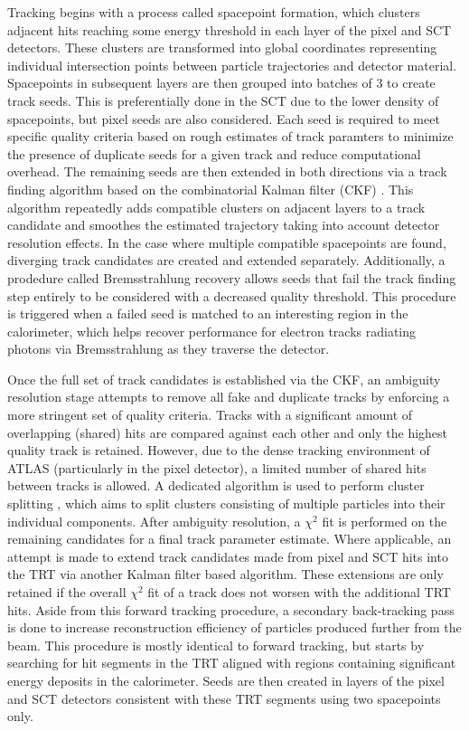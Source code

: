 Tracking begins with a process called spacepoint formation, which clusters adjacent hits reaching some energy 
threshold in each layer of the pixel and SCT detectors. These clusters are transformed into global coordinates 
representing individual intersection points between particle trajectories and detector material. Spacepoints in 
subsequent layers are then grouped into batches of 3 to create track seeds. This is preferentially done in the SCT 
due to the lower density of spacepoints, but pixel seeds are also considered. Each seed is required to meet specific 
quality criteria based on rough estimates of track paramters to minimize the presence of duplicate seeds for a given 
track and reduce computational overhead. The remaining seeds are then extended in both directions via a track 
finding algorithm based on the combinatorial Kalman filter (CKF) \cite{fruehwirt-kalman-filter}. This algorithm 
repeatedly adds compatible clusters on adjacent layers to a track candidate and smoothes the estimated trajectory 
taking into account detector resolution effects. In the case where multiple compatible spacepoints are found, 
diverging track candidates are created and extended separately. Additionally, a prodedure called Bremsstrahlung 
recovery allows seeds that fail the track finding step entirely to be considered with a decreased quality threshold. 
This procedure is triggered when a failed seed is matched to an interesting region in the calorimeter, which helps 
recover performance for electron tracks radiating photons via Bremsstrahlung as they traverse the detector. \par

Once the full set of track candidates is established via the CKF, an ambiguity resolution stage attempts to remove 
all fake and duplicate tracks by enforcing a more stringent set of quality criteria. Tracks with a significant 
amount of overlapping (shared) hits are compared against each other and only the highest quality track is retained. 
However, due to the dense tracking environment of ATLAS (particularly in the pixel detector), a limited number of 
shared hits between tracks is allowed. A dedicated algorithm is used to perform cluster splitting 
\cite{atlas-cluster-splitting}, which aims to split clusters consisting of multiple particles into their individual 
components. After ambiguity resolution, a $\chi^2$ fit is performed on the remaining candidates for a final track 
parameter estimate. Where applicable, an attempt is made to extend track candidates made from pixel and SCT hits 
into the TRT via another Kalman filter based algorithm. These extensions are only retained if the overall $\chi^2$ 
fit of a track does not worsen with the additional TRT hits. Aside from this forward tracking procedure, a 
secondary back-tracking pass is done to increase reconstruction efficiency of particles produced further from the 
beam. This procedure is mostly identical to forward tracking, but starts by searching for hit segments in the TRT 
aligned with regions containing significant energy deposits in the calorimeter. Seeds are then created in layers 
of the pixel and SCT detectors consistent with these TRT segments using two spacepoints only. \par

